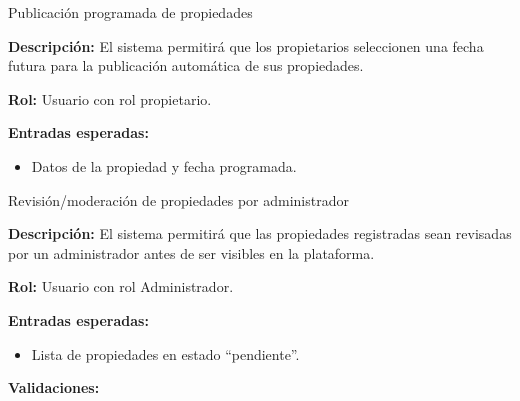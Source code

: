 \begin{requisito}{Publicación programada de propiedades}
	\item \textbf{Descripción:} El sistema permitirá que los propietarios seleccionen una fecha futura para la publicación automática de sus propiedades.
	\item \textbf{Rol:} Usuario con rol propietario.
	\item \textbf{Entradas esperadas:}
	\begin{itemize}
		\item Datos de la propiedad y fecha programada.
	\end{itemize}
\end{requisito}
\begin{requisito}{Revisión/moderación de propiedades por administrador}
	\item \textbf{Descripción:} El sistema permitirá que las propiedades registradas sean revisadas por un administrador antes de ser visibles en la plataforma.
	\item \textbf{Rol:} Usuario con rol Administrador.
	\item \textbf{Entradas esperadas:}
	\begin{itemize}
		\item Lista de propiedades en estado “pendiente”.
	\end{itemize}
	\item \textbf{Validaciones:}
\end{requisito}